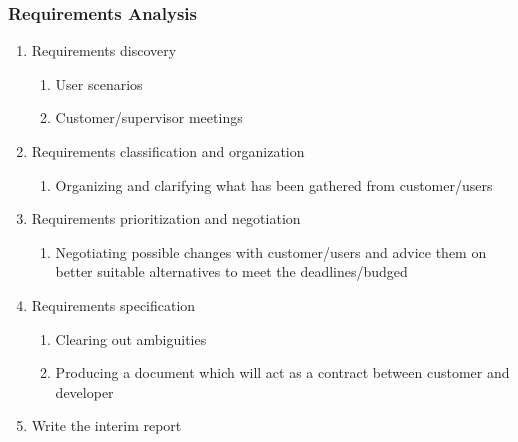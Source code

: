 \documentclass[12pt, a4paper]{report}   %
\begin{document}
\subsubsection{Requirements Analysis}
\begin{enumerate}
	\item Requirements discovery
		\begin{enumerate}
			\item User scenarios
			\item Customer/supervisor meetings
		\end{enumerate}
	\item Requirements classification and organization
		\begin{enumerate}
			\item Organizing and clarifying what has been gathered from customer/users
		\end{enumerate}
	\item Requirements prioritization and negotiation
		\begin{enumerate}
			\item Negotiating possible changes with customer/users and advice them on better suitable alternatives to meet the deadlines/budged
		\end{enumerate}
	\item Requirements specification
		\begin{enumerate}
			\item Clearing out ambiguities
			\item Producing a document which will act as a contract between customer and developer
		\end{enumerate}
	\item Write the interim report
\end{enumerate}

\end{document}
